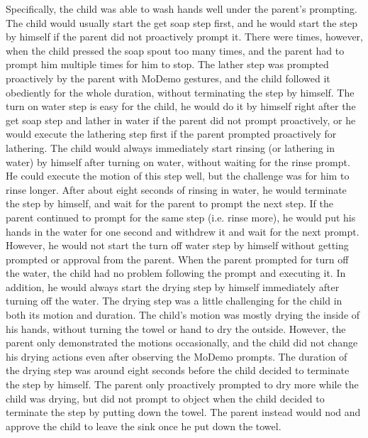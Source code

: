 Specifically, the child was able to wash hands well under the parent's prompting.  The child would usually start the get soap step first, and he would start the step by himself if the parent did not proactively prompt it.  There were times, however, when the child pressed the soap spout too many times, and the parent had to prompt him multiple times for him to stop.  The lather step was prompted proactively by the parent with MoDemo gestures, and the child followed it obediently for the whole duration, without terminating the step by himself.  The turn on water step is easy for the child, he would do it by himself right after the get soap step and lather in water if the parent did not prompt proactively, or he would execute the lathering step first if the parent prompted proactively for lathering.  The child would always immediately start rinsing (or lathering in water) by himself after turning on water, without waiting for the rinse prompt.  He could execute the motion of this step well, but the challenge was for him to rinse longer.  After about eight seconds of rinsing in water, he would terminate the step by himself, and wait for the parent to prompt the next step.  If the parent continued to prompt for the same step (i.e. rinse more), he would put his hands in the water for one second and withdrew it and wait for the next prompt.  However, he would not start the turn off water step by himself without getting prompted or approval from the parent.  When the parent prompted for turn off the water, the child had no problem following the prompt and executing it.  In addition, he would always start the drying step by himself immediately after turning off the water.  The drying step was a little challenging for the child in both its motion and duration.  The child's motion was mostly drying the inside of his hands, without turning the towel or hand to dry the outside.  However, the parent only demonstrated the motions occasionally, and the child did not change his drying actions even after observing the MoDemo prompts.  The duration of the drying step was around eight seconds before the child decided to terminate the step by himself.  The parent only proactively prompted to dry more while the child was drying, but did not prompt to object when the child decided to terminate the step by putting down the towel.  The parent instead would nod and approve the child to leave the sink once he put down the towel.

